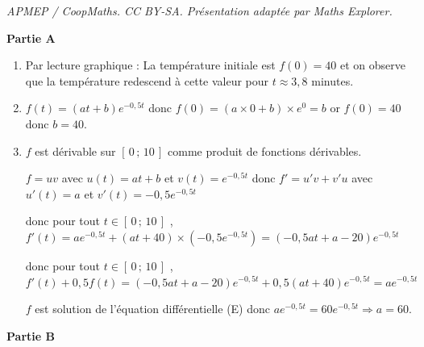 \documentclass[10pt]{article}
\begin{document}
\noindent\textit{APMEP / CoopMaths. CC BY-SA. Présentation adaptée par Maths Explorer.}\par\medskip
\medskip

\textbf{Partie A}

\medskip

\begin{enumerate}
\item Par lecture graphique : La température initiale est $f(0) = 40$ et on observe que la température redescend à cette valeur pour $t \approx 3,8$ minutes.

\item  $f(t) = (a t + b) e^{-0{,}5t}$ donc $f(0)= (a \times 0 +b ) \times e^{0}=b$ or $f(0)=40$ donc  $b = 40$.

\item $f$ est dérivable sur $[\,0\,;\,10\,]$ comme produit de fonctions dérivables. 

$f=uv$ avec $u(t)=at+b$ et $v(t)=e^{-0{,}5t}$ donc $f'=u'v+v'u$ avec $u'(t)=a$ et $v'(t)=-0,5e^{-0{,}5t}$ 

donc pour tout $t\in [\,0\,;\,10\,]$ , $ f'(t) =  a e^{-0{,}5t} + (a t + 40)\times \left(-0{,}5e^{-0{,}5t} \right)=\left(-0{,}5 a t + a - 20\right) e^{-0{,}5t}$

donc pour tout $t\in [\,0\,;\,10\,]$ , $f'(t) + 0{,}5 f(t) = \left(-0{,}5 a t + a - 20\right) e^{-0{,}5t} + 0{,}5 (a t + 40)e^{-0{,}5t}= a e^{-0{,}5t}$

$f$ est solution de l'équation différentielle (E) donc $a e^{-0{,}5t} = 60 e^{-0{,}5t} \Rightarrow a = 60$.
\end{enumerate}

\textbf{Partie B}
 
\end{document}
